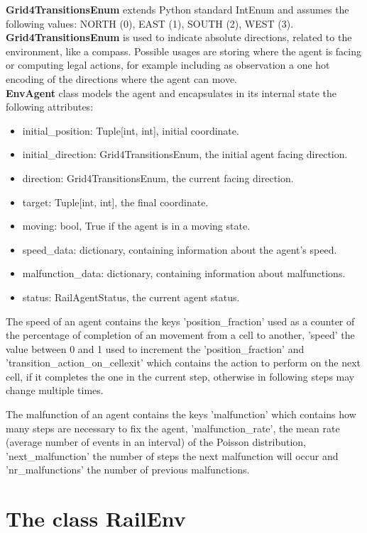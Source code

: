 \documentclass[11pt, a4paper, hidelinks]{report}
\begin{document}
\textbf{Grid4TransitionsEnum} extends Python standard IntEnum and assumes the following values: NORTH (0), EAST (1), SOUTH (2), WEST (3).
\textbf{Grid4TransitionsEnum} is used to indicate absolute directions, related to the environment, like a compass.
Possible usages are storing where the agent is facing or computing legal actions, for example including as observation a one hot encoding of the directions where the agent can move.
\\
\textbf{EnvAgent} class models the agent and encapsulates in its internal state the following attributes:
\begin{itemize}
	\item initial\_position: Tuple[int, int], initial coordinate.
	\item initial\_direction: Grid4TransitionsEnum, the initial agent facing direction.
	\item direction: Grid4TransitionsEnum, the current facing direction.
	\item target: Tuple[int, int], the final coordinate.
	\item moving: bool, True if the agent is in a moving state.
	\item speed\_data: dictionary, containing information about the agent's speed.
	\item malfunction\_data: dictionary, containing information about malfunctions.
	\item status: RailAgentStatus, the current agent status.
\end{itemize}

The speed of an agent contains the keys 'position\_fraction' used as a counter of the percentage of completion of an movement from a cell to another, 'speed' the value between 0 and 1 used to increment the 'position\_fraction' and 'transition\_action\_on\_cellexit' which contains the action to perform on the next cell, if it completes the one in the current step, otherwise in following steps may change multiple times.

The malfunction of an agent contains the keys 'malfunction' which contains how many steps are necessary to fix the agent, 'malfunction\_rate', the mean rate (average number of events in an interval) of the Poisson distribution, 'next\_malfunction' the number of steps the next malfunction will occur and 'nr\_malfunctions' the number of previous malfunctions.

\section{The class RailEnv}\label{sec:the-class-railenv}
\end{document}
